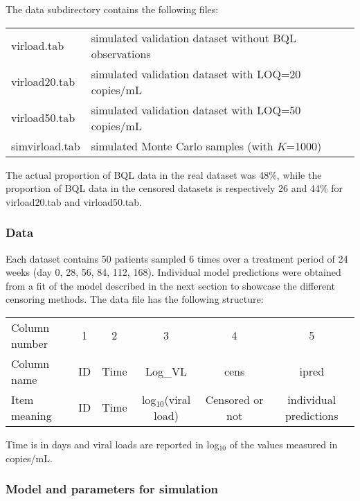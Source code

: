 The {\sf data} subdirectory contains the following files:
\begin{center}
\begin{tabular} {l l}
\hline
virload.tab & simulated validation dataset without BQL observations \\
virload20.tab & simulated validation dataset with LOQ=20 copies/mL \\
virload50.tab & simulated validation dataset with LOQ=50 copies/mL\\
simvirload.tab & simulated Monte Carlo samples (with $K$=1000) \\
\hline
\end{tabular}
\end{center}
The actual proportion of BQL data in the real dataset was 48\%, while the proportion of BQL data in the censored datasets is respectively 26 and 44\% for virload20.tab and virload50.tab.

\subsubsection{Data}

\hskip 18pt Each dataset contains 50 patients sampled 6 times over a treatment period of 24 weeks (day 0, 28, 56, 84, 112, 168). Individual model predictions were obtained from a fit of the model described in the next section to showcase the different censoring methods. The data file has the following structure:
\begin{center}
\begin{tabular} {l c c c c c}
\hline
Column number & 1 & 2 & 3 & 4 & 5\\
Column name & ID & Time & Log\_VL & cens & ipred \\
Item meaning & ID & Time & log$_{10}$(viral load) & Censored or not & individual predictions \\
\hline
\end{tabular}
\end{center}
Time is in days and viral loads are reported in log$_{10}$ of the values measured in copies/mL.

\subsubsection{Model and parameters for simulation}

